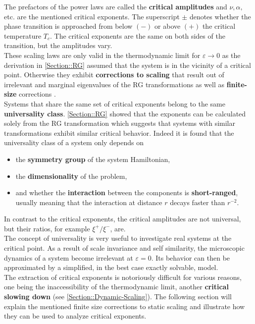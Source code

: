 	The prefactors of the power laws are called the \textbf{critical amplitudes} and $\nu, \alpha, $ etc. are the mentioned critical exponents. The superscript $\pm$ denotes whether the phase transition is approached from below $(-)$ or above $(+)$ the critical temperature $T_c$. The critical exponents are the same on both sides of the transition, but the amplitudes vary. \\
	
	These scaling laws are only valid in the thermodynamic limit for $\varepsilon \rightarrow 0$ as the derivation in \autoref{Section::RG} assumed that the system is in the vicinity of a critical point. Otherwise they exhibit \textbf{corrections to scaling} \cite{wegner1972corrections, pelissetto2002critical} that result out of irrelevant and marginal eigenvalues of the RG transformations as well as \textbf{finite-size} corrections \cite{domb1983vol8, goldenfeld2018lectures}. \\
	
	Systems that share the same set of critical exponents belong to the same \textbf{universality class}. \autoref{Section::RG} showed that the exponents can be calculated solely from the RG transformation which suggests that systems with similar transformations exhibit similar critical behavior. Indeed it is found that the universality class of a system only depends on
	\begin{itemize}
		\item the \textbf{symmetry group} of the system Hamiltonian,
		\item the \textbf{dimensionality} of the problem,
		\item and whether the \textbf{interaction} between the components is \textbf{short-ranged}, usually meaning that the interaction at distance $r$ decays faster than $r^{-2}$.
	\end{itemize}
	In contrast to the critical exponents, the critical amplitudes are not universal, but their ratios, for example $\xi^+/\xi^-$, are.\\
	
	The concept of universality is very useful to investigate real systems at the critical point. As a result of scale invariance and self similarity, the microscopic dynamics of a system become irrelevant at $\varepsilon =	0$. Its behavior can then be approximated by a simplified, in the best case exactly solvable, model. \\
	
	The extraction of critical exponents is notoriously difficult for various reasons, one being the inaccessibility of the thermodynamic limit, another \textbf{critical slowing down} (see \autoref{Section::Dynamic-Scaling}). The following section will explain the mentioned finite size corrections to static scaling and illustrate how they can be used to analyze critical exponents.
